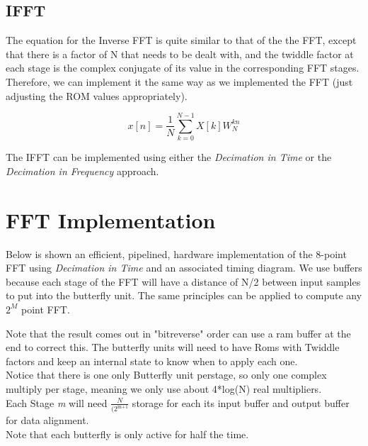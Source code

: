 \documentclass{article}
\begin{document}
\pagebreak

\subsection {IFFT}
The equation for the Inverse FFT is quite similar to that of the the FFT, except that there is a factor of N that needs to be dealt with,
and the twiddle factor at each stage is the complex conjugate of its value in the corresponding FFT stages.
Therefore, we can implement it the same way as we implemented the FFT (just adjusting the ROM values appropriately).

      \begin{equation} x\left[n\right] = \frac{1}{N} \sum_{k=0}^{N-1}X\left[k\right] W_{N}^{kn} \end{equation}

The IFFT can be implemented using either the \emph{Decimation in Time} or the \emph{Decimation in Frequency} approach.

\pagebreak
\section{FFT Implementation}

Below is shown an efficient, pipelined, hardware implementation of the 8-point FFT using \emph{Decimation in Time}
and an associated timing diagram.
We use buffers because each stage of the FFT will have a distance of N/2 between input samples to put into the butterfly unit.
The same principles can be applied to compute any $2^{M}$ point FFT.

Note that the result comes out in "bitreverse" order can use a ram buffer at the end to correct this.
The butterfly units will need to have Roms with Twiddle factors and keep an internal state to know when to apply each one. \\
Notice that there is one only Butterfly unit perstage, so only one complex multiply per stage, meaning we only use about 4*log(N) real multipliers. \\
Each Stage \emph{m} will need $\frac{N}{(2^{\text{m+1}}}$ storage for each its input buffer and output buffer for data alignment. \\
Note that each butterfly is only active for half the time.
\end{document}
